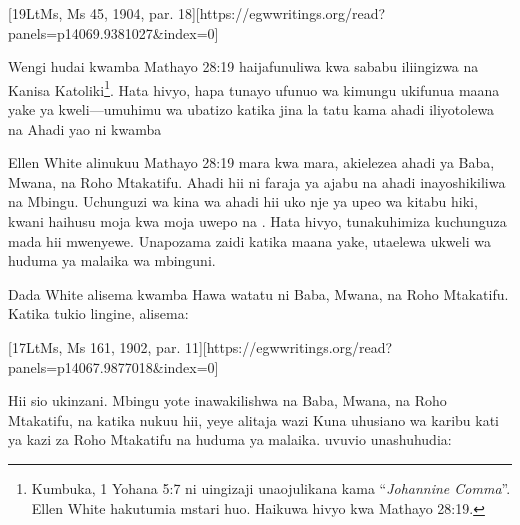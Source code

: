 [19LtMs, Ms 45, 1904, par. 18][https://egwwritings.org/read?panels=p14069.9381027&index=0]

Wengi hudai kwamba Mathayo 28:19 haijafunuliwa kwa sababu iliingizwa na Kanisa Katoliki\footnote{Kumbuka, 1 Yohana 5:7  ni uingizaji unaojulikana kama “\textit{Johannine Comma}”. Ellen White hakutumia mstari huo. Haikuwa hivyo kwa Mathayo 28:19.}. Hata hivyo, hapa tunayo ufunuo wa kimungu ukifunua maana yake ya kweli—umuhimu wa ubatizo katika jina la tatu kama ahadi iliyotolewa na  Ahadi yao ni kwamba 

Ellen White alinukuu Mathayo 28:19 mara kwa mara, akielezea ahadi ya Baba, Mwana, na Roho Mtakatifu. Ahadi hii ni faraja ya ajabu na ahadi inayoshikiliwa na Mbingu. Uchunguzi wa kina wa ahadi hii uko nje ya upeo wa kitabu hiki, kwani haihusu moja kwa moja uwepo na . Hata hivyo, tunakuhimiza kuchunguza mada hii mwenyewe. Unapozama zaidi katika maana yake, utaelewa ukweli wa huduma ya malaika wa mbinguni.

Dada White alisema kwamba  Hawa watatu ni Baba, Mwana, na Roho Mtakatifu. Katika tukio lingine, alisema:

[17LtMs, Ms 161, 1902, par. 11][https://egwwritings.org/read?panels=p14067.9877018&index=0]

Hii sio ukinzani. Mbingu yote inawakilishwa na Baba, Mwana, na Roho Mtakatifu, na katika nukuu hii, yeye alitaja wazi  Kuna uhusiano wa karibu kati ya kazi za Roho Mtakatifu na huduma ya malaika. uvuvio unashuhudia:

